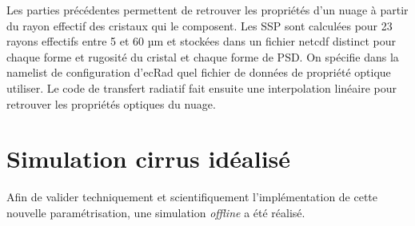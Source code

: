 Les parties précédentes permettent de retrouver les propriétés d'un nuage à partir du rayon effectif des cristaux qui le composent. Les SSP sont calculées pour 23 rayons effectifs entre 5 et 60 µm et stockées dans un fichier netcdf distinct pour chaque forme et rugosité du cristal et chaque forme de PSD. On spécifie dans la namelist de configuration d'ecRad quel fichier de données de propriété optique utiliser. Le code de transfert radiatif fait ensuite une interpolation linéaire pour retrouver les propriétés optiques du nuage.

\section{Simulation cirrus idéalisé}

Afin de valider techniquement et scientifiquement l'implémentation de cette nouvelle paramétrisation, une simulation \emph{offline} a été réalisé.